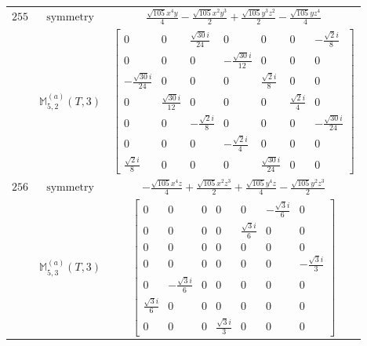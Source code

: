 \documentclass[fleqn,8pt,landscape]{jsarticle}
\begin{document}
\begin{longtable}{ccc}
$ 255 $ & $ \text{symmetry} $ & $ \frac{\sqrt{105} x^{4} y}{4} - \frac{\sqrt{105} x^{2} y^{3}}{2} + \frac{\sqrt{105} y^{3} z^{2}}{2} - \frac{\sqrt{105} y z^{4}}{4} $ \\
$  $ & $ \mathbb{M}_{5,2}^{(a)}(T,3) $ & $ \begin{bmatrix} 0 & 0 & \frac{\sqrt{30} i}{24} & 0 & 0 & 0 & - \frac{\sqrt{2} i}{8} \\ 0 & 0 & 0 & - \frac{\sqrt{30} i}{12} & 0 & 0 & 0 \\ - \frac{\sqrt{30} i}{24} & 0 & 0 & 0 & \frac{\sqrt{2} i}{8} & 0 & 0 \\ 0 & \frac{\sqrt{30} i}{12} & 0 & 0 & 0 & \frac{\sqrt{2} i}{4} & 0 \\ 0 & 0 & - \frac{\sqrt{2} i}{8} & 0 & 0 & 0 & - \frac{\sqrt{30} i}{24} \\ 0 & 0 & 0 & - \frac{\sqrt{2} i}{4} & 0 & 0 & 0 \\ \frac{\sqrt{2} i}{8} & 0 & 0 & 0 & \frac{\sqrt{30} i}{24} & 0 & 0 \end{bmatrix} $ \\ \hline
$ 256 $ & $ \text{symmetry} $ & $ - \frac{\sqrt{105} x^{4} z}{4} + \frac{\sqrt{105} x^{2} z^{3}}{2} + \frac{\sqrt{105} y^{4} z}{4} - \frac{\sqrt{105} y^{2} z^{3}}{2} $ \\
$  $ & $ \mathbb{M}_{5,3}^{(a)}(T,3) $ & $ \begin{bmatrix} 0 & 0 & 0 & 0 & 0 & - \frac{\sqrt{3} i}{6} & 0 \\ 0 & 0 & 0 & 0 & \frac{\sqrt{3} i}{6} & 0 & 0 \\ 0 & 0 & 0 & 0 & 0 & 0 & 0 \\ 0 & 0 & 0 & 0 & 0 & 0 & - \frac{\sqrt{3} i}{3} \\ 0 & - \frac{\sqrt{3} i}{6} & 0 & 0 & 0 & 0 & 0 \\ \frac{\sqrt{3} i}{6} & 0 & 0 & 0 & 0 & 0 & 0 \\ 0 & 0 & 0 & \frac{\sqrt{3} i}{3} & 0 & 0 & 0 \end{bmatrix} $ \\ \hline
\end{longtable}
\end{document}
